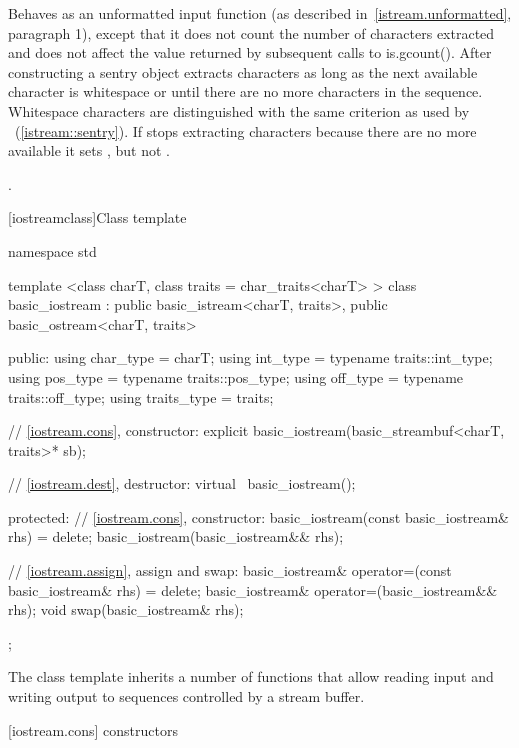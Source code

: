 \begin{itemdescr}
\pnum
\effects
Behaves as an unformatted input function (as described in~\ref{istream.unformatted},
paragraph 1), except that it does not count the number of characters extracted and
does not affect the value returned by subsequent calls to is.gcount(). After
constructing a sentry object extracts characters as long as the next available
character  is whitespace or until there are no more characters in the sequence.
Whitespace characters are distinguished with the same criterion as used by
~(\ref{istream::sentry}).
If
stops extracting characters because there are no more available it sets
,
but not
.

\pnum
\returns
{}.
\end{itemdescr}

[iostreamclass]{Class template }

%
\begin{codeblock}
namespace std {
  template <class charT, class traits = char_traits<charT> >
  class basic_iostream
    : public basic_istream<charT, traits>,
      public basic_ostream<charT, traits> {
  public:
    using char_type   = charT;
    using int_type    = typename traits::int_type;
    using pos_type    = typename traits::pos_type;
    using off_type    = typename traits::off_type;
    using traits_type = traits;

    // \ref{iostream.cons}, constructor:
    explicit basic_iostream(basic_streambuf<charT, traits>* sb);

    // \ref{iostream.dest}, destructor:
    virtual ~basic_iostream();

  protected:
    // \ref{iostream.cons}, constructor:
    basic_iostream(const basic_iostream& rhs) = delete;
    basic_iostream(basic_iostream&& rhs);

    // \ref{iostream.assign}, assign and swap:
    basic_iostream& operator=(const basic_iostream& rhs) = delete;
    basic_iostream& operator=(basic_iostream&& rhs);
    void swap(basic_iostream& rhs);
  };
}
\end{codeblock}

\pnum
The class template
inherits a number of functions that allow reading input and writing output to
sequences controlled by a stream buffer.

[iostream.cons]{ constructors}


